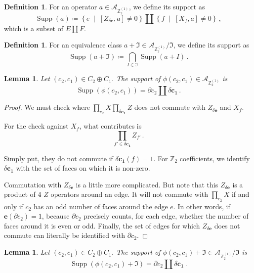 \documentclass[aps,twocolumn,prx,floatfix,preprintnumbers, nofootinbib,10pt]{revtex4-2}
\numberwithin{equation}{section}
\newtheorem{lemma}[theorem]{Lemma}
\theoremstyle{definition}
\newtheorem{definition}[theorem]{Definition}
\theoremstyle{remark}
\theoremstyle{claim}
\newcommand{\be}{\begin{equation}}
\newcommand{\ee}{\end{equation}}
\newcommand{\Z}{{\mathbb Z}}
\newcommand{\mc}[1]{\mathcal{#1}}
\newcommand{\sqpar}[1]{\left[ #1 \right]}
\newcommand{\curpar}[1]{\left\{ #1 \right\}}
\begin{document}
\begin{definition}
 For an operator $a \in \mc{A}_{\Z_2^{(1)}}$, we define its support as
 \be
 \operatorname{Supp}(a) \coloneqq \curpar{e \; \mid \; \sqpar{Z_{\delta \bm{e}}, a} \neq 0} \coprod \curpar{f \; \mid \; \sqpar{X_f, a} \neq 0} \,,
 \ee
 which is a subset of $E \coprod F$.
\end{definition}

\begin{definition}
 For an equivalence class $a + \mathfrak{I} \in \mathcal{A}_{\Z_2^{(1)}} / \mathfrak{I}$, we define its support as
 \be
 \operatorname{Supp}(a + \mathfrak{I}) \coloneqq \bigcap_{I \in \mathfrak{I}} \operatorname{Supp}(a + I) \,.
 \ee
\end{definition}

\begin{lemma}
 Let $(c_2, c_1) \in C_2 \oplus C_1$. The support of $\phi(c_2, c_1) \in \mc{A}_{\Z_2^{(1)}}$ is
 \be
 \operatorname{Supp}(\phi(c_2, c_1)) = \partial c_2 \coprod \delta \bm{c_1} \,.
 \ee
\end{lemma}

\begin{proof}
 We must check where $\prod_{c_2} X \prod_{\delta \bm{c_1}} Z$ does not commute with $Z_{\delta \bm{e}}$ and $X_f$.

 For the check against $X_f$, what contributes is 
 \be
 \prod_{f' \in \delta \bm{c_1}} Z_{f'} \,.
 \ee

 Simply put, they do not commute if $\delta \bm{c_1}(f) = 1$. For $\Z_2$ coefficients, we identify $\delta \bm{c_1}$ with the set of faces on which it is non-zero.

 Commutation with $Z_{\delta \bm{e}}$ is a little more complicated. But note that this $Z_{\delta \bm{e}}$ is a product of 4 $Z$ operators around an edge. It will not commute with $\prod_{c_2} X$ if and only if $c_2$ has an odd number of faces around the edge $e$. In other words, if $\bm{e}(\partial c_2) = 1$, because $\partial c_2$ precisely counts, for each edge, whether the number of faces around it is even or odd. Finally, the set of edges for which $Z_{\delta \bm{e}}$ does not commute can literally be identified with $\partial c_2$.
\end{proof}

\begin{lemma}\label{lemma:quotient_support}
 Let $(c_2, c_1) \in C_2 \oplus C_1$. The support of $\phi(c_2, c_1) + \mathfrak{I} \in \mc{A}_{\Z_2^{(1)}} / \mathfrak{I}$ is
 \be
 \operatorname{Supp}(\phi(c_2, c_1) + \mathfrak{I}) = \partial c_2 \coprod \delta \bm{c_1} \,.
 \ee
\end{lemma}
\end{document}
